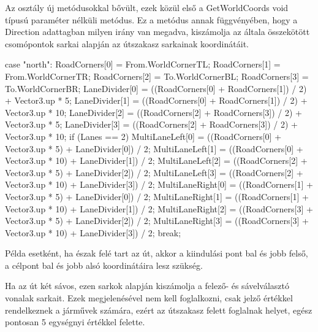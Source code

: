Az osztály új metódusokkal bővült, ezek közül első a GetWorldCoords void típusú paraméter nélküli metódus. Ez a metódus annak függvényében, hogy a Direction adattagban milyen irány van megadva, kiszámolja az általa összekötött csomópontok sarkai alapján az útszakasz sarkainak koordinátáit.
\begin{cpp}
case "north":
                    RoadCorners[0] = From.WorldCornerTL;
                    RoadCorners[1] = From.WorldCornerTR;
                    RoadCorners[2] = To.WorldCornerBL;
                    RoadCorners[3] = To.WorldCornerBR;
                    LaneDivider[0] = ((RoadCorners[0] + 
                    RoadCorners[1]) / 2) + Vector3.up * 5;
                    LaneDivider[1] = ((RoadCorners[0] + 
                    RoadCorners[1]) / 2) + Vector3.up * 10;
                    LaneDivider[2] = ((RoadCorners[2] +
                     RoadCorners[3]) / 2) + Vector3.up * 5;
                    LaneDivider[3] = ((RoadCorners[2] + 
                    RoadCorners[3]) / 2) + Vector3.up * 10;
                    if (Lanes == 2)
                    {
                        MultiLaneLeft[0] = ((RoadCorners[0] + 
                        Vector3.up * 5) + LaneDivider[0]) / 2;
                        MultiLaneLeft[1] = ((RoadCorners[0] + 
                        Vector3.up * 10) + LaneDivider[1]) / 2;
                        MultiLaneLeft[2] = ((RoadCorners[2] + 
                        Vector3.up * 5) + LaneDivider[2]) / 2;
                        MultiLaneLeft[3] = ((RoadCorners[2] +
                        Vector3.up * 10) + LaneDivider[3]) / 2;
                        MultiLaneRight[0] = ((RoadCorners[1] + 
                        Vector3.up * 5) + LaneDivider[0]) / 2;
                        MultiLaneRight[1] = ((RoadCorners[1] + 
                        Vector3.up * 10) + LaneDivider[1]) / 2;
                        MultiLaneRight[2] = ((RoadCorners[3] + 
                        Vector3.up * 5) + LaneDivider[2]) / 2;
                        MultiLaneRight[3] = ((RoadCorners[3] + 
                        Vector3.up * 10) + LaneDivider[3]) / 2;
                    }
                    break;
\end{cpp}
Példa esetként, ha észak felé tart az út, akkor a kiindulási pont bal és jobb felső, a célpont bal és jobb alsó koordinátáira lesz szükség.

Ha az út két sávos, ezen sarkok alapján kiszámolja a felező- és sávelválasztó vonalak sarkait. Ezek megjelenésével nem kell foglalkozni, csak jelző értékkel rendelkeznek a járművek számára, ezért az útszakasz felett foglalnak helyet, egész pontosan 5 egységnyi értékkel felette.

